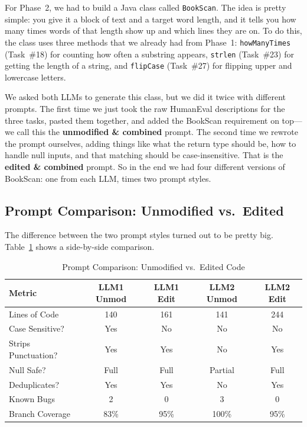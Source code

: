 \documentclass[12pt, a4paper]{article}
\begin{document}
For Phase~2, we had to build a Java class called \texttt{BookScan}. The idea is pretty simple: you give it a block of text and a target word length, and it tells you how many times words of that length show up and which lines they are on. To do this, the class uses three methods that we already had from Phase~1: \texttt{howManyTimes} (Task~\#18) for counting how often a substring appears, \texttt{strlen} (Task~\#23) for getting the length of a string, and \texttt{flipCase} (Task~\#27) for flipping upper and lowercase letters.

We asked both LLMs to generate this class, but we did it twice with different prompts. The first time we just took the raw HumanEval descriptions for the three tasks, pasted them together, and added the BookScan requirement on top---we call this the \textbf{unmodified \& combined} prompt. The second time we rewrote the prompt ourselves, adding things like what the return type should be, how to handle null inputs, and that matching should be case-insensitive. That is the \textbf{edited \& combined} prompt. So in the end we had four different versions of BookScan: one from each LLM, times two prompt styles.

\subsection{Prompt Comparison: Unmodified vs.\ Edited}

The difference between the two prompt styles turned out to be pretty big. Table~\ref{tab:prompt-comparison} shows a side-by-side comparison.

\begin{table}[H]
\centering
\caption{Prompt Comparison: Unmodified vs.\ Edited Code}
\label{tab:prompt-comparison}
\begin{tabularx}{\textwidth}{l c c c c}
\toprule
\textbf{Metric} & \textbf{LLM1 Unmod} & \textbf{LLM1 Edit} & \textbf{LLM2 Unmod} & \textbf{LLM2 Edit} \\
\midrule
Lines of Code        & 140  & 161  & 141  & 244  \\
Case Sensitive?      & Yes  & No   & No   & No   \\
Strips Punctuation?  & Yes  & Yes  & No   & Yes  \\
Null Safe?           & Full & Full & Partial & Full \\
Deduplicates?        & Yes  & Yes  & No   & Yes  \\
Known Bugs           & 2    & 0    & 3    & 0    \\
Branch Coverage      & 83\% & 95\% & 100\% & 95\% \\
\bottomrule
\end{tabularx}
\end{table}
\end{document}

